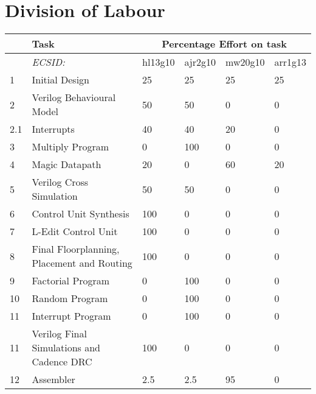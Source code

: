 

\chapter{Division of Labour}


\begin{table}[!h]
\begin{tabular}{p{0.8cm}p{\textwidth-10.2cm}p{1.7cm}p{1.7cm}p{1.7cm}p{1.7cm}}
     & Task             & \multicolumn{4}{c}{Percentage Effort on task} \\ \hline
     &  \textit{ECSID:}					& hl13g10 & ajr2g10 & mw20g10 & arr1g13 \\ \hline
1    & Initial Design					& 25	& 25	& 25 	& 25 \\ \hline 
2    & Verilog Behavioural Model			& 50	& 50	& 0 	& 0 \\ \hline 
2.1  & Interrupts 					& 40	& 40 	& 20 	& 0 \\ 
3    & Multiply Program					& 0	& 100	& 0 	& 0 \\ \hline 
4    & Magic Datapath					& 20	& 0	& 60 	& 20 \\ 
5    & Verilog Cross Simulation				& 50	& 50	& 0 	& 0 \\ \hline 
6    & Control Unit Synthesis				& 100	& 0	& 0 	& 0 \\ \hline 
7    & L-Edit Control Unit				& 100	& 0	& 0 	& 0 \\ \hline 
8    & Final Floorplanning, Placement and Routing	& 100	& 0	& 0 	& 0 \\ \hline 
9    & Factorial Program				& 0	& 100	& 0 	& 0 \\ \hline 
10   & Random Program					& 0	& 100	& 0 	& 0 \\ \hline 
11   & Interrupt Program				& 0	& 100	& 0 	& 0 \\ \hline 
11   & Verilog Final Simulations and Cadence DRC	& 100	& 0	& 0 	& 0 \\ \hline 
12   & Assembler					& 2.5	& 2.5	& 95 	& 0 \\ \hline 

\end{tabular}
\end{table}
